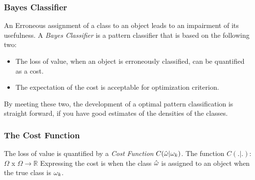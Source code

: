 \subsubsection{Bayes Classifier}
\label{sub:Bayes Classifier}
An Erroneous assignment of a class to an object leads to an impairment of its usefulness.
A \textit{Bayes Classifier} is a pattern classifier that is based on the following two:
\begin{itemize}
    \item The loss of value, when an object is erroneously classified, can be quantified as a cost.
    \item The expectation of the cost is acceptable for optimization criterion.
\end{itemize}
By meeting these two, the development of a optimal pattern classification is straight forward, if you have good estimates of the densities of the classes.
\subsubsection{The Cost Function}
\label{sub:The Cost Function}
The loss of value is quantified by a \textit{Cost Function} $C(\hat\omega|\omega_k)$. The function $C(.|.)$: $\Omega$ x $\Omega\rightarrow\mathbb{R}$
Expressing the cost is when the class $\hat\omega$ is assigned to an object when the true class is $\omega_k$.
